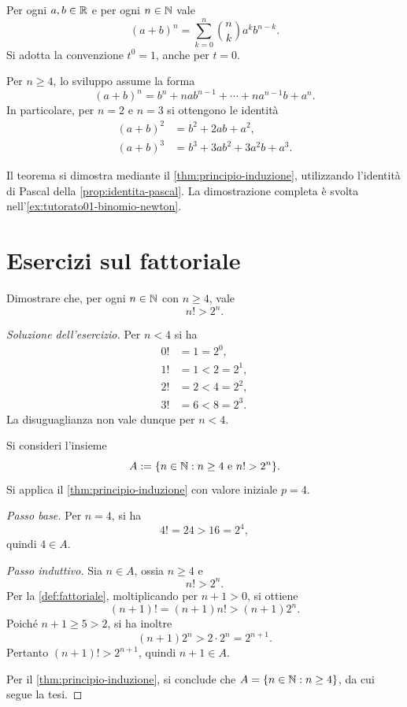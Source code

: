 \begin{theorem}
\label{thm:binomio-newton}
Per ogni \(a,b\in\mathbb{R}\) e per ogni \(n\in\mathbb{N}\) vale
\[
  (a+b)^n=\sum_{k=0}^{n}\binom{n}{k}a^k b^{n-k}.
\]
Si adotta la convenzione \(t^0=1\), anche per \(t=0\).
\end{theorem}

Per \(n\ge4\), lo sviluppo assume la forma
\[
  (a+b)^n
  =b^n+nab^{n-1}+\cdots+na^{n-1}b+a^n.
\]
In particolare, per \(n=2\) e \(n=3\) si ottengono le identità
\[
\begin{aligned}
  (a+b)^2 &=b^2+2ab+a^2,\\
  (a+b)^3 &=b^3+3ab^2+3a^2b+a^3.
\end{aligned}
\]

Il teorema si dimostra mediante il \cref{thm:principio-induzione},
utilizzando l'identità di Pascal della \cref{prop:identita-pascal}.
La dimostrazione completa è svolta
nell'\cref{ex:tutorato01-binomio-newton}.

\section{Esercizi sul fattoriale}
\label{sec:lez05-esercizi-fattoriale}

\begin{exercise}
\label{ex:fattoriale-maggiore-due-n}
Dimostrare che, per ogni \(n\in\mathbb{N}\) con \(n\ge4\), vale
\[
  n!>2^n.
\]
\end{exercise}

\begin{proof}[Soluzione dell'esercizio]
Per \(n<4\) si ha
\[
\begin{aligned}
  0!&=1=2^0,\\
  1!&=1<2=2^1,\\
  2!&=2<4=2^2,\\
  3!&=6<8=2^3.
\end{aligned}
\]
La disuguaglianza non vale dunque per \(n<4\).

Si consideri l'insieme
\[
  A:=\{n\in\mathbb{N}:n\ge4\text{ e }n!>2^n\}.
\]
Si applica il \cref{thm:principio-induzione} con valore iniziale
\(p=4\).

\emph{Passo base.}
Per \(n=4\), si ha
\[
  4!=24>16=2^4,
\]
quindi \(4\in A\).

\emph{Passo induttivo.}
Sia \(n\in A\), ossia \(n\ge4\) e
\[
  n!>2^n.
\]
Per la \cref{def:fattoriale}, moltiplicando per \(n+1>0\),
si ottiene
\[
  (n+1)!=(n+1)n!>(n+1)2^n.
\]
Poiché \(n+1\ge5>2\), si ha inoltre
\[
  (n+1)2^n>2\cdot2^n=2^{n+1}.
\]
Pertanto \((n+1)!>2^{n+1}\), quindi \(n+1\in A\).

Per il \cref{thm:principio-induzione}, si conclude che
\(A=\{n\in\mathbb{N}:n\ge4\}\), da cui segue la tesi.
\end{proof}

